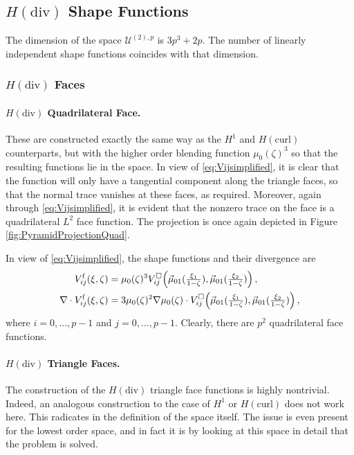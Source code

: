 \subsection{\texorpdfstring{$H(\mathrm{div})$}{Hdiv} Shape Functions}

The dimension of the space $\mathcal{U}^{(2),p}$ is $3p^3+2p$.
The number of linearly independent shape functions coincides with that dimension.

\subsubsection{\texorpdfstring{$H(\mathrm{div})$}{Hdiv} Faces}

\paragraph{\texorpdfstring{$H(\mathrm{div})$}{Hdiv} Quadrilateral Face.} 
These are constructed exactly the same way as the $H^1$ and $H(\mathrm{curl})$ counterparts, but with the higher order blending function $\mu_0(\zeta)^3$ so that the resulting functions lie in the space.
In view of \eqref{eq:Vijsimplified}, it is clear that the function will only have a tangential component along the triangle faces, so that the normal trace vanishes at these faces, as required.
Moreover, again through \eqref{eq:Vijsimplified}, it is evident that the nonzero trace on the face is a quadrilateral $L^2$ face function.
The projection is once again depicted in Figure \ref{fig:PyramidProjectionQuad}.

In view of \eqref{eq:Vijsimplified}, the shape functions and their divergence are
\begin{equation}
	\begin{aligned}
		V_{ij}^\mathrm{f}(\xi,\zeta)&=\mu_0(\zeta)^3V_{ij}^\square\Big(\vec{\mu}_{01}(\textstyle{\frac{\xi_1}{1-\zeta}}),\vec{\mu}_{01}(\textstyle{\frac{\xi_2}{1-\zeta}})\Big)\,,\\
    	\nabla\cdot V_{ij}^\mathrm{f}(\xi,\zeta)&=3\mu_0(\zeta)^2\nabla\mu_0(\zeta)\cdot
    		V_{ij}^\square\Big(\vec{\mu}_{01}(\textstyle{\frac{\xi_1}{1-\zeta}}),\vec{\mu}_{01}(\textstyle{\frac{\xi_2}{1-\zeta}})\Big)\,,	
	\end{aligned}
	\label{eq:PyrHdivQuadFace}
\end{equation}
where $i=0,\ldots,p-1$ and $j=0,\ldots,p-1$.
Clearly, there are $p^2$ quadrilateral face functions.

\paragraph{\texorpdfstring{$H(\mathrm{div})$}{Hdiv} Triangle Faces.} 
The construction of the $H(\mathrm{div})$ triangle face functions is highly nontrivial.
Indeed, an analogous construction to the case of $H^1$ or $H(\mathrm{curl})$ does not work here.
This radicates in the definition of the space itself.
The issue is even present for the lowest order space, and in fact it is by looking at this space in detail that the problem is solved.

